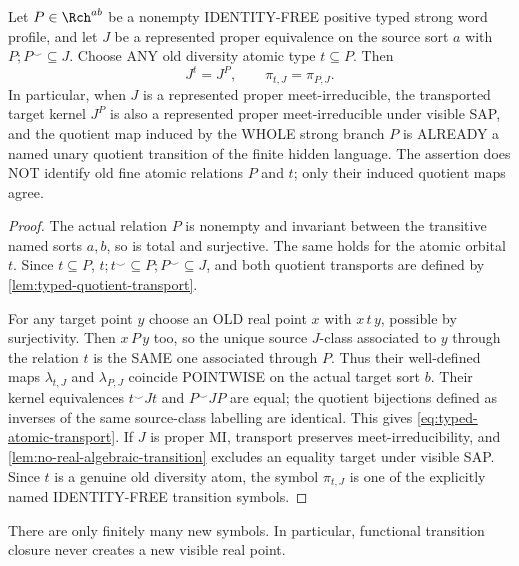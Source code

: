 \begin{lemma}
\label{lem:typed-branch-atomic-transport}
Let \(P\in\Rch^{ab}\) be a nonempty
IDENTITY-FREE positive typed strong
word profile, and let \(J\) be a
represented proper equivalence on
the source sort \(a\) with
\(P;P^\smile\subseteq J\).
Choose ANY old diversity
atomic type \(t\subseteq P\).
Then
\[
      J^t=J^P,\qquad
      \pi_{t,J}=\pi_{P,J}.
\tag{QT-Atom}\label{eq:typed-atomic-transport}
\]
In particular, when \(J\) is a
represented proper meet-irreducible,
the transported target kernel
\(J^P\) is also a represented proper
meet-irreducible under visible SAP,
and the quotient map induced by
the WHOLE strong branch \(P\) is
ALREADY a named unary quotient
transition of the finite hidden
language. The assertion does NOT
identify old fine atomic relations
\(P\) and \(t\); only their
induced quotient maps agree.
\end{lemma}
\begin{proof}
The actual relation \(P\) is
nonempty and invariant between
the transitive named sorts
\(a,b\), so is total and
surjective. The same holds for
the atomic orbital \(t\).
Since \(t\subseteq P\),
\(t;t^\smile\subseteq
P;P^\smile\subseteq J\),
and both quotient transports
are defined by
\cref{lem:typed-quotient-transport}.

For any target point \(y\)
choose an OLD real point
\(x\) with \(x\,t\,y\),
possible by surjectivity.
Then \(x\,P\,y\) too,
so the unique source
\(J\)-class associated to
\(y\) through the
relation \(t\) is the SAME
one associated through \(P\).
Thus their well-defined
maps \(\lambda_{t,J}\)
and \(\lambda_{P,J}\)
coincide POINTWISE on
the actual target sort \(b\).
Their kernel equivalences
\(t^\smile Jt\) and
\(P^\smile JP\) are equal;
the quotient bijections
defined as inverses of the
same source-class labelling
are identical. This gives
\eqref{eq:typed-atomic-transport}.
If \(J\) is proper MI,
transport preserves
meet-irreducibility, and
\cref{lem:no-real-algebraic-transition}
excludes an equality target
under visible SAP. Since
\(t\) is a genuine old
diversity atom, the
symbol \(\pi_{t,J}\)
is one of the explicitly
named IDENTITY-FREE
transition symbols.
\end{proof}

There are only finitely many new symbols.  In particular, functional
transition closure never creates a new visible real point.

